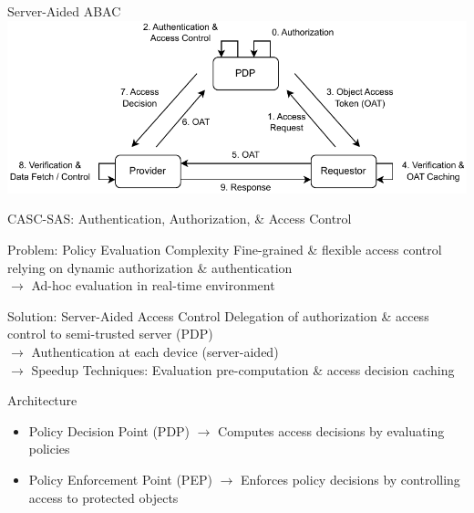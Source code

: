 \documentclass[en]{sdqbeamer}
\begin{document}
\begin{frame}{Server-Aided ABAC}
    \centering
    \includegraphics[width=1.0\textwidth]{./figures/access_control_request_delegation.drawio.pdf}
\end{frame}
\begin{frame}{CASC-SAS: Authentication, Authorization, \& Access Control}
    \begin{redblock}{Problem: Policy Evaluation Complexity}
        Fine-grained \& flexible access control relying on dynamic authorization \& authentication
        \\$\rightarrow$ Ad-hoc evaluation in real-time environment
    \end{redblock}

    \begin{greenblock}{Solution: Server-Aided Access Control}
        Delegation of authorization \& access control to semi-trusted server (PDP)
        \\$\rightarrow$ Authentication at each device (server-aided)
        \\$\rightarrow$ Speedup Techniques: Evaluation pre-computation \& access decision caching
    \end{greenblock}

    \begin{grayblock}{Architecture \parencite{Hu2014,Oasis2013}}
        \begin{itemize}
            \item Policy Decision Point (PDP) $\rightarrow$ Computes access decisions by evaluating policies
            \item Policy Enforcement Point (PEP) $\rightarrow$ Enforces policy decisions by controlling access to protected objects
        \end{itemize}
    \end{grayblock}
\end{frame}
\end{document}
